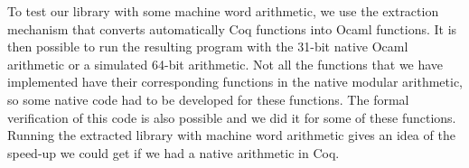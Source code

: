 To test our library with some machine word arithmetic, we use the extraction
mechanism that converts automatically {\sc Coq} functions into {\sc Ocaml} functions.
It is then possible to run the resulting program with the 31-bit native
{\sc Ocaml} arithmetic or a simulated 64-bit arithmetic. 
Not all the functions that we have implemented have their corresponding 
functions in the native modular arithmetic, 
so some native code had to be developed for these functions.
The formal verification of this code is also possible and we did it for some of these
functions. Running the extracted library with machine word arithmetic
gives an idea of the speed-up we could get if we had a native arithmetic in {\sc Coq}.

